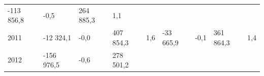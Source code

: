 \begin{longtable}[]{@{}lllllllll@{}}
\begin{minipage}[t]{0.12\columnwidth}
-113 856,8\strut
\end{minipage} & \begin{minipage}[t]{0.06\columnwidth}\raggedright
-0,5\strut
\end{minipage} & \begin{minipage}[t]{0.08\columnwidth}\raggedright
264 885,3\strut
\end{minipage} & \begin{minipage}[t]{0.06\columnwidth}\raggedright
1,1\strut
\end{minipage}\tabularnewline
\begin{minipage}[t]{0.05\columnwidth}\raggedright
2011\strut
\end{minipage} & \begin{minipage}[t]{0.10\columnwidth}\raggedright
-12 324,1\strut
\end{minipage} & \begin{minipage}[t]{0.06\columnwidth}\raggedright
-0,0\strut
\end{minipage} & \begin{minipage}[t]{0.17\columnwidth}\raggedright
407 854,3\strut
\end{minipage} & \begin{minipage}[t]{0.06\columnwidth}\raggedright
1,6\strut
\end{minipage} & \begin{minipage}[t]{0.12\columnwidth}\raggedright
-33 665,9\strut
\end{minipage} & \begin{minipage}[t]{0.06\columnwidth}\raggedright
-0,1\strut
\end{minipage} & \begin{minipage}[t]{0.08\columnwidth}\raggedright
361 864,3\strut
\end{minipage} & \begin{minipage}[t]{0.06\columnwidth}\raggedright
1,4\strut
\end{minipage}\tabularnewline
\begin{minipage}[t]{0.05\columnwidth}\raggedright
2012\strut
\end{minipage} & \begin{minipage}[t]{0.10\columnwidth}\raggedright
-156 976,5\strut
\end{minipage} & \begin{minipage}[t]{0.06\columnwidth}\raggedright
-0,6\strut
\end{minipage} & \begin{minipage}[t]{0.17\columnwidth}\raggedright
278 501,2\strut

\end{minipage}
\end{longtable}
